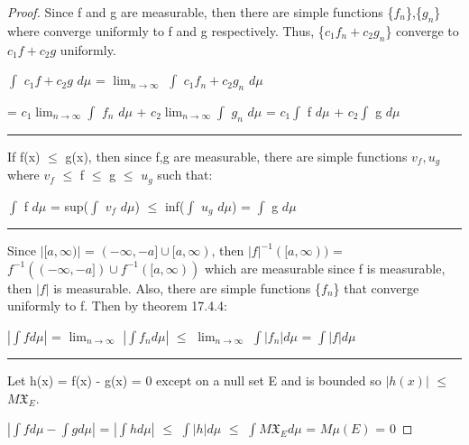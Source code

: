     \begin{proof}
        Since f and g are measurable, then there are simple functions
        \{$f_n$\},\{$g_n$\} where converge uniformly to f and g respectively.
        Thus, \{$c_1f_n+c_2g_n$\} converge to $c_1f+c_2g$ uniformly.

        \hspace{0.5cm}
        $\int$ $c_1f + c_2g$ $d\mu$
        = $\lim_{n \rightarrow \infty}$ $\int$ $c_1f_n + c_2g_n$ $d\mu$

        \hspace{3.3cm}
        = $c_1 \lim_{n \rightarrow \infty} \int$ $f_n$ $d\mu$
            + $c_2 \lim_{n \rightarrow \infty} \int$ $g_n$ $d\mu$
        = $c_1 \int$ f $d\mu$ + $c_2 \int$ g $d\mu$

        \rule[0.1cm]{16.7cm}{0.01cm}

        If f(x) $\leq$ g(x), then since f,g are measurable, there
        are simple functions $v_f,u_g$ where
        $v_f$ $\leq$ f $\leq$ g $\leq$ $u_g$ such that:

        \hspace{0.5cm}
        $\int$ f $d\mu$
        = sup($\int$ $v_f$ $d\mu$)
        $\leq$ inf($\int$ $u_g$ $d\mu$)
        = $\int$ g $d\mu$

        \rule[0.1cm]{16.7cm}{0.01cm}

        Since $|[a,\infty)|$ = $(-\infty,-a] \cup [a,\infty)$, then
        $|f|^{-1}([a,\infty))$ = $f^{-1}((-\infty,-a]) \cup f^{-1}([a,\infty))$
        which are measurable since f is measurable, then $|f|$ is measurable.
        Also, there are simple functions
        \{$f_n$\} that converge uniformly to f.
        Then by {\color{red} theorem 17.4.4}:

        \hspace{0.5cm}
        $|\int f d\mu|$
        = $\lim_{n \rightarrow \infty}$ $|\int f_n d\mu|$
        $\leq$ $\lim_{n \rightarrow \infty}$ $\int |f_n| d\mu$
        = $\int |f| d\mu$

        \rule[0.1cm]{16.7cm}{0.01cm}

        Let h(x) = f(x) - g(x) = 0 except on a null set E and is bounded
        so $|h(x)|$ $\leq$ $M \mathfrak{X}_E$.

        \hspace{0.5cm}
        $|\int f d\mu - \int g d\mu|$
        = $|\int h d\mu|$
        $\leq$ $\int |h| d\mu$
        $\leq$ $\int M \mathfrak{X}_E d\mu$
        = $M \mu(E)$ = 0
    \end{proof}

